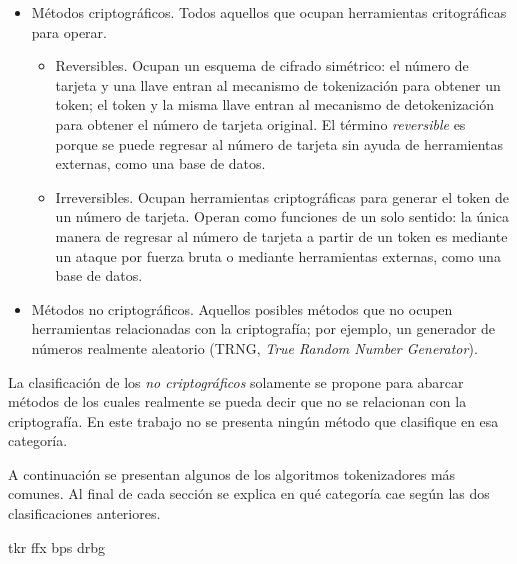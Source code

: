 \begin{itemize}
  \item Métodos criptográficos. Todos aquellos que ocupan herramientas
    critográficas para operar.
    \begin{itemize}
      \item Reversibles. Ocupan un esquema de cifrado simétrico: el número
        de tarjeta y una llave entran al mecanismo de tokenización para obtener
        un token; el token y la misma llave entran al mecanismo de
        detokenización para obtener el número de tarjeta original. El término
        \textit{reversible} es porque se puede regresar al número de tarjeta sin
        ayuda de herramientas externas, como una base de datos.
      \item Irreversibles. Ocupan herramientas criptográficas para generar el
        token de un número de tarjeta. Operan como funciones de un solo sentido:
        la única manera de regresar al número de tarjeta a partir de un token es
        mediante un ataque por fuerza bruta o mediante herramientas externas,
        como una base de datos.
    \end{itemize}
  \item Métodos no criptográficos. Aquellos posibles métodos que no ocupen
    herramientas relacionadas con la criptografía; por ejemplo, un generador de
    números realmente aleatorio (TRNG, \textit{True Random Number Generator}).
\end{itemize}

La clasificación de los \textit{no criptográficos} solamente se propone para
abarcar métodos de los cuales realmente se pueda decir que no se relacionan con
la criptografía. En este trabajo no se presenta ningún método que clasifique en
esa categoría.

A continuación se presentan algunos de los algoritmos tokenizadores más comunes.
Al final de cada sección se explica en qué categoría cae según las dos
clasificaciones anteriores.

{tkr}
{ffx}
{bps}
{drbg}
